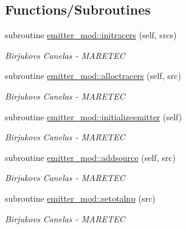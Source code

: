 \subsection*{Functions/\+Subroutines}
\begin{DoxyCompactItemize}
\item 
subroutine \hyperlink{namespaceemitter__mod_ad89dfc083eae7362441c353225a74ebc}{emitter\+\_\+mod\+::initracers} (self, srcs)
\begin{DoxyCompactList}\small\item\em Birjukovs Canelas -\/ M\+A\+R\+E\+T\+EC \end{DoxyCompactList}\item 
subroutine \hyperlink{namespaceemitter__mod_a7c677125988390e4c57909e4ea82d902}{emitter\+\_\+mod\+::alloctracers} (self, src)
\begin{DoxyCompactList}\small\item\em Birjukovs Canelas -\/ M\+A\+R\+E\+T\+EC \end{DoxyCompactList}\item 
subroutine \hyperlink{namespaceemitter__mod_a6376ad0f8e1739b29caf672aa0750373}{emitter\+\_\+mod\+::initializeemitter} (self)
\begin{DoxyCompactList}\small\item\em Birjukovs Canelas -\/ M\+A\+R\+E\+T\+EC \end{DoxyCompactList}\item 
subroutine \hyperlink{namespaceemitter__mod_ab704fb0e2eb9b3b4b9542706b6fb4eaf}{emitter\+\_\+mod\+::addsource} (self, src)
\begin{DoxyCompactList}\small\item\em Birjukovs Canelas -\/ M\+A\+R\+E\+T\+EC \end{DoxyCompactList}\item 
subroutine \hyperlink{namespaceemitter__mod_a5c219dd6692a761ad4bf968ae750fcc6}{emitter\+\_\+mod\+::setotalnp} (src)
\begin{DoxyCompactList}\small\item\em Birjukovs Canelas -\/ M\+A\+R\+E\+T\+EC \end{DoxyCompactList}\end{DoxyCompactItemize}
